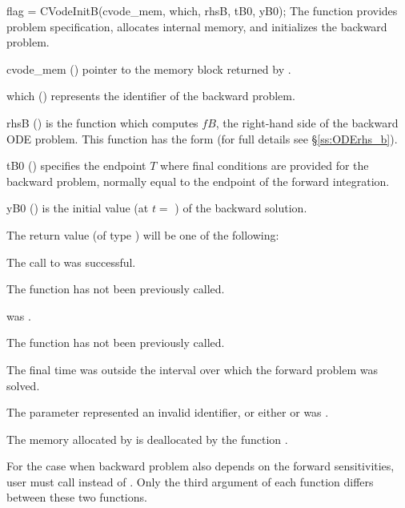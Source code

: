 {
  flag = CVodeInitB(cvode\_mem, which, rhsB, tB0, yB0);
}
{
  The function  provides problem specification, allocates internal memory,
  and initializes the backward problem.
}
{
  \begin{args}
  \item[cvode\_mem] ()
    pointer to the {\cvodes} memory block returned by .
  \item[which] ()
    represents the identifier of the backward problem.
  \item[rhsB] ()
    is the {\CC} function which computes $fB$, the right-hand side of the
    backward ODE problem. This function has the form
     (for full details see \S\ref{ss:ODErhs_b}).
  \item[tB0] ()
    specifies the endpoint $T$ where final conditions are provided for the
    backward problem, normally equal to the endpoint of the forward integration.
  \item[yB0] ()
    is the initial value (at $t =$ ) of the backward solution.
  \end{args}
}
{
  The return value  (of type ) will be one of the following:
  \begin{args}
  \item[\Id{CV\_SUCCESS}]
    The call to  was successful.
  \item[\Id{CV\_NO\_MALLOC}]
    The function  has not been previously called.
  \item[\Id{CV\_MEM\_NULL}]
     was .
  \item[\Id{CV\_NO\_ADJ}]
    The function  has not been previously called.
  \item[\Id{CV\_BAD\_TB0}]
    The final time  was outside the interval over which the forward problem
    was solved.
  \item[\Id{CV\_ILL\_INPUT}]
    The parameter  represented an invalid identifier, or either
     or  was .
  \end{args}
}
{
  The memory allocated by  is deallocated by the function
  .
}

For the case when backward problem also depends on the forward
sensitivities, user must call  instead of .
Only the third argument of each function differs between these two
functions.

